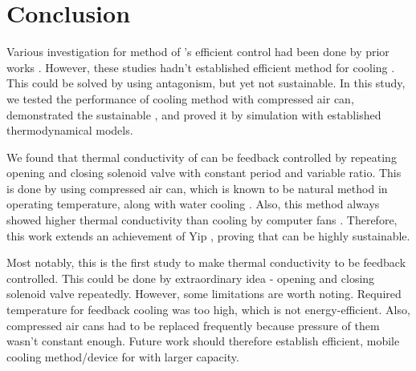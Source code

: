 \section{Conclusion}
Various investigation for method of \scp's efficient control had been done by prior works \cite{haines,mirvakili,yip}. %
However, these studies hadn't established efficient method for cooling \scp. %
This could be solved by using antagonism, but yet not sustainable.
In this study, we tested the performance of cooling method with compressed air can, demonstrated the sustainable \apcnospace, and proved it by simulation with established thermodynamical models. %

We found that thermal conductivity of \scp can be feedback controlled by repeating opening and closing solenoid valve with constant period and variable ratio. %
This is done by using compressed air can, which is known to be natural method in operating temperature, along with water cooling \cite{madden}.
Also, this method always showed higher thermal conductivity than cooling by computer fans \cite{yip}.
Therefore, this work extends an achievement of Yip \etal, proving that \apc can be highly sustainable.

Most notably, this is the first study to make thermal conductivity to be feedback controlled. This could be done by extraordinary idea - opening and closing solenoid valve repeatedly.
However, some limitations are worth noting. Required temperature for feedback cooling was too high, which is not energy-efficient.
Also, compressed air cans had to be replaced frequently because pressure of them wasn't constant enough. 
Future work should therefore establish efficient, mobile cooling method/device for \scp with larger capacity.



